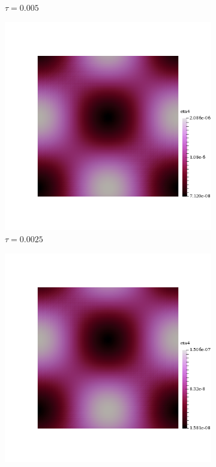 \begin{figure}[h!]
\begin{subfigure}[b]{0.24\textwidth}
    \caption{$\tau=0.005$}
  \end{subfigure}
  \begin{subfigure}[b]{0.24\textwidth}
    \includegraphics[width=\textwidth,height=\textheight,keepaspectratio,height=\textheight,keepaspectratio]{figures/2_mpet/biomedical/time/eta4_dt3.png}
    \caption{$\tau=0.0025$}
  \end{subfigure}
  \begin{subfigure}[b]{0.24\textwidth}
    \includegraphics[width=\textwidth,height=\textheight,keepaspectratio,height=\textheight,keepaspectratio]{figures/2_mpet/biomedical/time/eta4_dt4.png}

\end{subfigure}
\end{figure}
